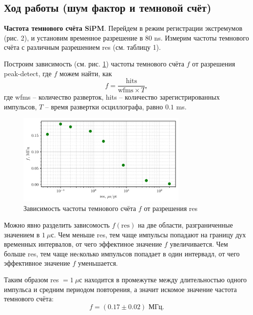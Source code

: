 

\subsection*{Ход работы (шум фактор и темновой счёт)}



\textbf{Частота темнового счёта SiPM}.
Перейдем в режим регистрации экстремумов (рис. 2), и установим временное разрешение в 80 ns. Измерим частоты темнового счёта с различным разрешением res (см. таблицу 1). 


 Построим зависимость (см. рис. \ref{fig:1}) частоты темнового счёта $f$ от разрешения peak-detect,
где $f$ можем найти, как
\begin{equation*}
    f = \frac{\text{hits}}{\text{wfms} \times T},
\end{equation*}
где wfms -- количество разверток, hits -- количество зарегистрированных импульсов, $T$ -- время развертки осциллографа, равно $0.1$ ms.

\begin{figure}[h]
    \centering
    \includegraphics[width=0.75\textwidth]{figures/plot1.pdf}
    \vspace{-5mm}
    \caption{Зависимость частоты темнового счёта $f$ от разрешения res}
    \label{fig:1}
\end{figure}

Можно явно разделить зависомость $f(\text{res})$ на две области, разграниченные значением в $1 \ \mu$с. Чем меньше res, тем чаще импульсы попадают на границу дух временных интервалов, от чего эффектиное значение $f$ увеличивается. Чем больше res, тем чаще неcколько импульсов попадает в один интервадл, от чего эффективное значение $f$ уменьшается. 

Таким образом res $ = 1 \ \mu$с находится в промежутке между длительностью одного импульса и средним периодом повторения, а значит искомое значение частота темнового счёта:
\begin{equation*}
    f = (0.17 \pm 0.02) \text{ МГц}.
\end{equation*}


